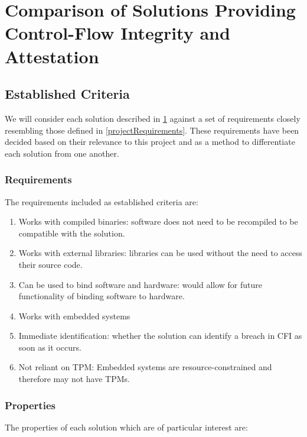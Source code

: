 \section{Comparison of Solutions Providing Control-Flow Integrity and Attestation} \label{comparisonOfCFISolutions}

\subsection{Established Criteria}\label{requirementsIntro}

We will consider each solution described in \ref{comparisonOfCFISolutions} against a set of requirements closely resembling those defined in \ref{projectRequirements}. These requirements have been decided based on their relevance to this project and as a method to differentiate each solution from one another.

\subsubsection*{Requirements}\label{Requirements}

The requirements included as established criteria are:

\begin{enumerate}[label=(\arabic*),noitemsep]
	\item Works with compiled binaries: software does not need to be recompiled to be compatible with the solution.
	\item Works with external libraries: libraries can be used without the need to access their source code.
	\item Can be used to bind software and hardware: would allow for future functionality of binding software to hardware.
	\item Works with embedded systems
	\item Immediate identification: whether the solution can identify a breach in CFI as soon as it occurs.
	\item Not reliant on TPM: Embedded systems are resource-constrained and therefore may not have TPMs.
\end{enumerate}

\subsubsection*{Properties}\label{Properties}

The properties of each solution which are of particular interest are:


